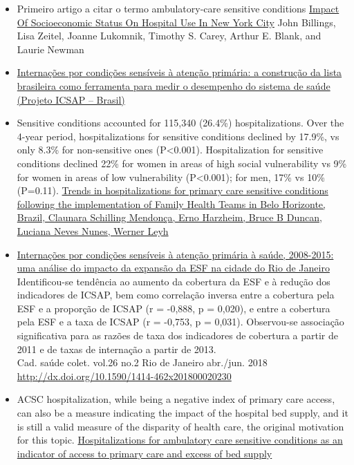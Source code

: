\documentclass[]{book}
\begin{document}
\begin{itemize}
\item
  Primeiro artigo a citar o termo ambulatory-care sensitive conditions \href{https://www.healthaffairs.org/doi/pdf/10.1377/hlthaff.12.1.162}{Impact Of Socioeconomic Status On Hospital Use In New York City} John Billings, Lisa Zeitel, Joanne Lukomnik, Timothy S. Carey, Arthur E. Blank, and Laurie Newman
\item
  \href{http://www.scielo.br/pdf/csp/v25n6/16.pdf}{Internações por condições sensíveis à atenção primária: a construção da lista brasileira como ferramenta para medir o desempenho do sistema de saúde (Projeto ICSAP -- Brasil)}
\item
  Sensitive conditions accounted for 115,340 (26.4\%) hospitalizations. Over the 4-year period, hospitalizations for sensitive conditions declined by 17.9\%, vs only 8.3\% for non-sensitive ones (P\textless{}0.001). Hospitalization for sensitive conditions declined 22\% for women in areas of high social vulnerability vs 9\% for women in areas of low vulnerability (P\textless{}0.001); for men, 17\% vs 10\% (P=0.11). \href{https://academic.oup.com/heapol/article/27/4/348/605470}{Trends in hospitalizations for primary care sensitive conditions following the implementation of Family Health Teams in Belo Horizonte, Brazil, Claunara Schilling Mendonça, Erno Harzheim, Bruce B Duncan, Luciana Neves Nunes, Werner Leyh}
\item
  \href{http://www.scielo.br/scielo.php?script=sci_arttext\&pid=S1414-462X2018000200178\&lng=pt\&nrm=iso\&tlng=pt}{Internações por condições sensíveis à atenção primária à saúde, 2008-2015: uma análise do impacto da expansão da ESF na cidade do Rio de Janeiro}\\
  Identificou-se tendência ao aumento da cobertura da ESF e à redução dos indicadores de ICSAP, bem como correlação inversa entre a cobertura pela ESF e a proporção de ICSAP (r = -0,888, p = 0,020), e entre a cobertura pela ESF e a taxa de ICSAP (r = -0,753, p = 0,031). Observou-se associação significativa para as razões de taxa dos indicadores de cobertura a partir de 2011 e de taxas de internação a partir de 2013.\\
  Cad. saúde colet. vol.26 no.2 Rio de Janeiro abr./jun. 2018 \url{http://dx.doi.org/10.1590/1414-462x201800020230}
\item
  ACSC hospitalization, while being a negative index of primary care access, can also be a measure indicating the impact of the hospital bed supply, and it is still a valid measure of the disparity of health care, the original motivation for this topic. \href{https://bmchealthservres.biomedcentral.com/articles/10.1186/s12913-019-4098-x}{Hospitalizations for ambulatory care sensitive conditions as an indicator of access to primary care and excess of bed supply}

\end{itemize}
\end{document}
